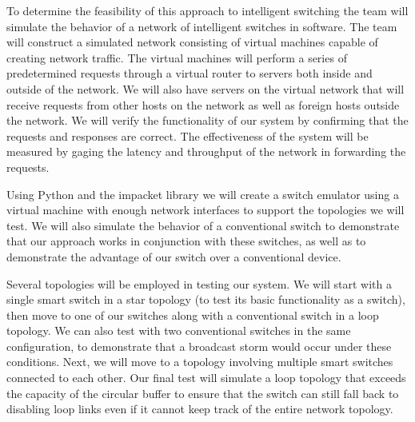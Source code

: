 	To determine the feasibility of this approach to intelligent switching the team will simulate the behavior of a network of intelligent switches in software.
	The team will construct a simulated network consisting of virtual machines capable of creating network traffic.
	The virtual machines will perform a series of predetermined requests through a virtual router to servers both inside and outside of the network.
	We will also have servers on the virtual network that will receive requests from other hosts on the network as well as foreign hosts outside the network.
	We will verify the functionality of our system by confirming that the requests and responses are correct.
	The effectiveness of the system will be measured by gaging the latency and throughput of the network in forwarding the requests.
	
	Using Python and the impacket library we will create a switch emulator using a virtual machine with enough network interfaces to support the topologies we will test.
	We will also simulate the behavior of a conventional switch to demonstrate that our approach works in conjunction with these switches, as well as to demonstrate the advantage of our switch over a conventional device.
	
	Several topologies will be employed in testing our system.
	We will start with a single smart switch in a star topology (to test its basic functionality as a switch), then move to one of our switches along with a conventional switch in a loop topology.
	We can also test with two conventional switches in the same configuration, to demonstrate that a broadcast storm would occur under these conditions.
	Next, we will move to a topology involving multiple smart switches connected to each other.
	Our final test will simulate a loop topology that exceeds the capacity of the circular buffer to ensure that the switch can still fall back to disabling loop links even if it cannot keep track of the entire network topology.
